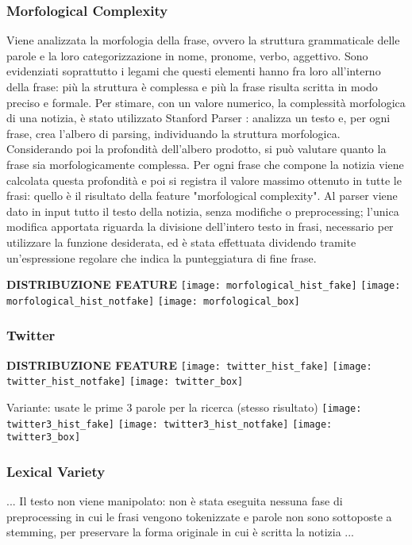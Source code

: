 \documentclass{article}
\begin{document}
\begin{multicols}{2}
				\subsubsection{Morfological Complexity}
					Viene analizzata la morfologia della frase, ovvero la struttura grammaticale delle parole e la loro categorizzazione in nome, pronome, verbo, aggettivo. Sono evidenziati soprattutto i legami che questi elementi hanno fra loro all'interno della frase: più la struttura è complessa e più la frase risulta scritta in modo preciso e formale. 
					Per stimare, con un valore numerico, la complessità morfologica di una notizia, è stato utilizzato Stanford Parser \cite{stanfordparser}: analizza un testo e, per ogni frase, crea l'albero di parsing, individuando la struttura morfologica. Considerando poi la profondità dell'albero prodotto, si può valutare quanto la frase sia morfologicamente complessa.
					Per ogni frase che compone la notizia viene calcolata questa profondità e poi si registra il valore massimo ottenuto in tutte le frasi: quello è il risultato della feature "morfological complexity".
					Al parser viene dato in input tutto il testo della notizia, senza modifiche o preprocessing; l'unica modifica apportata riguarda la divisione dell'intero testo in frasi, necessario per utilizzare la funzione desiderata, ed è stata effettuata dividendo tramite un'espressione regolare che indica la punteggiatura di fine frase.
					
					\textbf{DISTRIBUZIONE FEATURE}	
					\texttt{[image: morfological\_hist\_fake]}
					\texttt{[image: morfological\_hist\_notfake]}
					\texttt{[image: morfological\_box]}
					
					
				\subsubsection{Twitter}
				\textbf{DISTRIBUZIONE FEATURE}	
				\texttt{[image: twitter\_hist\_fake]}
				\texttt{[image: twitter\_hist\_notfake]}
				\texttt{[image: twitter\_box]}
				
				Variante: usate le prime 3 parole per la ricerca (stesso risultato)
				\texttt{[image: twitter3\_hist\_fake]}
				\texttt{[image: twitter3\_hist\_notfake]}
				\texttt{[image: twitter3\_box]}
				
				\subsubsection{Lexical Variety}
				... Il testo non viene manipolato: non è stata eseguita nessuna fase di preprocessing in cui le frasi vengono tokenizzate e parole non sono sottoposte a stemming, per preservare la forma originale in cui è scritta la notizia ...
								

\end{multicols}
\end{document}
